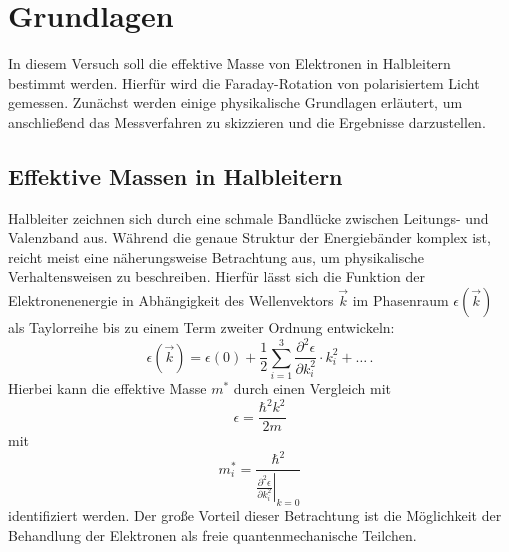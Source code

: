 \section{Grundlagen} %
\label{sec:grundlagen}
In diesem Versuch soll die effektive Masse von Elektronen in Halbleitern
bestimmt werden.
Hierfür wird die Faraday-Rotation von polarisiertem Licht gemessen.
Zunächst werden einige physikalische Grundlagen erläutert, um anschließend
das Messverfahren zu skizzieren und die Ergebnisse darzustellen.

\subsection{Effektive Massen in Halbleitern} %
\label{sub:effektive_masse}
Halbleiter zeichnen sich durch eine schmale Bandlücke zwischen Leitungs-
und Valenzband aus.
Während die genaue Struktur der Energiebänder komplex ist, reicht meist
eine näherungsweise Betrachtung aus, um physikalische Verhaltensweisen zu
beschreiben.
Hierfür lässt sich die Funktion der Elektronenenergie in Abhängigkeit des
Wellenvektors $\vec{k}$
im Phasenraum $\epsilon(\vec{k})$ als Taylorreihe bis zu einem Term zweiter
Ordnung entwickeln:
\begin{equation}
    \label{eqn:energie}
    \epsilon\left(\vec{k}\right) = \epsilon(0) + \frac{1}{2}\sum_{i=1}^{3}\frac{\partial^2\epsilon}{\partial k_i^2}\cdot k_i^2 + \dots\,.
\end{equation}
Hierbei kann die effektive Masse $m^*$ durch einen Vergleich mit
\begin{equation*}
    \epsilon = \frac{\hbar^2 k^2}{2m}
\end{equation*}
mit
\begin{equation}
    m_i^* = \frac{\hbar^2}{\left.\frac{\partial^2\epsilon}{\partial k_i^2}\right|_{k=0}}
\end{equation}
identifiziert werden. Der große Vorteil dieser Betrachtung ist die
Möglichkeit der Behandlung der Elektronen als freie quantenmechanische
Teilchen.
